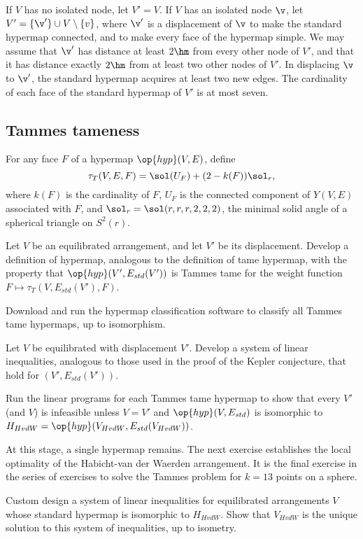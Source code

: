 If $V$ has no isolated node, let $V'=V$.  If $V$ has an isolated node
$\v$, let $V' = \{\v'\}\cup V\setminus\{v\}$, where $\v'$ is a
displacement of $\v$ to make the standard hypermap connected, and to
make every face of the hypermap simple.  We may assume that $\v'$ has
distance  at least $2\hm$ from every other node of $V'$, and that it
has distance  exactly $2\hm$ from at least two other nodes of $V'$.  In
displacing $\v$ to $\v'$, the standard hypermap acquires at least two
new edges.  The cardinality of each face of the standard hypermap of
$V'$ is at most seven.


\subsection{Tammes tameness}

For any face $F$ of a hypermap $\op{hyp}(V,E)$, define
\[
\tau_T(V,E,F) = \sol(U_F) + (2- k(F)) \sol_r,
\]
where $k(F)$ is the cardinality of $F$, $U_F$ is the connected
component of $Y(V,E)$ associated with $F$, and $\sol_r =
\sol(r,r,r,2,2,2)$, the minimal solid angle of a spherical triangle on
$S^2(r)$.

\begin{exer}  
  Let $V$ be an equilibrated arrangement, and let $V'$ be its
  displacement.  Develop a definition of 
  hypermap, analogous to the definition of tame hypermap, with the
  property that $\op{hyp}(V',E_{std}(V'))$ is Tammes tame for the
  weight function $F\mapsto \tau_T(V,E_{std}(V'),F)$.
\end{exer}

\begin{exer}  
  Download and run the hypermap classification software to classify all Tammes tame
  hypermaps, up to isomorphism.
\end{exer}

\begin{exer} Let $V$ be equilibrated with displacement $V'$.  Develop
  a system of linear inequalities, analogous to those used in the
  proof of the Kepler conjecture, that hold for $(V',E_{std}(V'))$.  
\end{exer}

\begin{exer}
  Run the linear programs for each Tammes tame hypermap to show that
  every $V'$ (and $V$) is infeasible unless $V=V'$ and
  $\op{hyp}(V,E_{std})$ is isomorphic to
  $H_{HvdW}=\op{hyp}(V_{HvdW},E_{std}(V_{HvdW}))$.
\end{exer}

At this stage, a single hypermap remains.  The next exercise
establishes the local optimality of the Habicht-van der Waerden
arrangement.  It is the final exercise in the series of exercises to
solve the Tammes problem for $k=13$ points on a sphere.

\begin{exer} 
  Custom design a system of linear inequalities for equilibrated
  arrangements $V$ whose standard hypermap is isomorphic to
  $H_{HvdW}$.  Show that $V_{HvdW}$ is the unique solution to this
  system of inequalities, up to isometry.
\end{exer}





